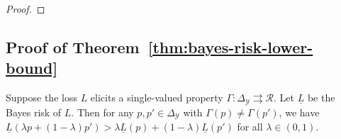 \documentclass[anon,12pt]{colt2021} %
\newcommand{\Comments}{1}
\newcommand{\mynote}[2]{\ifnum\Comments=1\textcolor{#1}{#2}\fi}
\newcommand{\raf}[1]{\mynote{green}{[RF: #1]}}
\newcommand{\reals}{\mathbb{R}}
\newcommand{\simplex}{\Delta_\Y}
\newcommand{\affhull}{\mathrm{affhull}}
\newcommand{\R}{\mathcal{R}}
\newcommand{\Sc}{\mathcal{S}}  %
\newcommand{\Y}{\mathcal{Y}}
\newcommand{\lbar}{\underline{L}} %
\newcommand{\toto}{\rightrightarrows}
\begin{document}
\begin{proof}
\end{proof}

\subsection{Proof of Theorem~\ref{thm:bayes-risk-lower-bound}}

\begin{lemma}
	\label{lem:elic-complex-bayes-concave}
	Suppose the loss $L$ elicits a single-valued property $\Gamma:\simplex\toto\R$.
	Let $\lbar$ be the Bayes risk of $L$.
	Then for any $p,p'\in\simplex$ with $\Gamma(p)\neq\Gamma(p')$, we have $\lbar(\lambda p + (1-\lambda) p') > \lambda \lbar(p) + (1-\lambda) \lbar(p')$ for all $\lambda\in(0,1)$.
\end{lemma}

\end{document}
